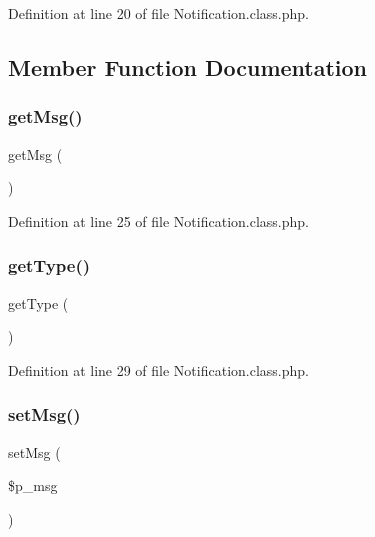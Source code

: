 Definition at line 20 of file Notification.\+class.\+php.



\subsection{Member Function Documentation}
\mbox{\label{class_notification_a177bc4ecf4167a98368da00df884413b}} 
\subsubsection{\texorpdfstring{get\+Msg()}{getMsg()}}
{\footnotesize\ttfamily get\+Msg (\begin{DoxyParamCaption}{ }\end{DoxyParamCaption})}



Definition at line 25 of file Notification.\+class.\+php.

\mbox{\label{class_notification_a830b5c75df72b32396701bc563fbe3c7}} 
\subsubsection{\texorpdfstring{get\+Type()}{getType()}}
{\footnotesize\ttfamily get\+Type (\begin{DoxyParamCaption}{ }\end{DoxyParamCaption})}



Definition at line 29 of file Notification.\+class.\+php.

\mbox{\label{class_notification_afee42eec7fc90f1111f0bc31ad1bfe11}} 
\subsubsection{\texorpdfstring{set\+Msg()}{setMsg()}}
{\footnotesize\ttfamily set\+Msg (\begin{DoxyParamCaption}\item[{}]{\$p\+\_\+msg }\end{DoxyParamCaption})}




